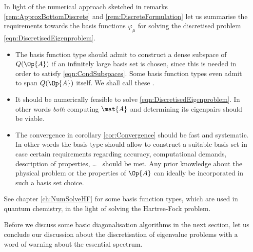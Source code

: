 \begin{rem}
	\label{rem:ChoiceBasisFunction}
In light of the numerical approach sketched in
remarks \ref{rem:ApproxBottomDiscrete} and \ref{rem:DiscreteFormulation}
let us summarise the requirements towards the basis functions $\varphi_\mu$
for solving the discretised problem \eqref{eqn:DiscretisedEigenproblem}.
\begin{itemize}
	\item The basis function type should admit
		to construct a dense subspace of $Q(\Op{A})$
		if an infinitely large basis set is chosen,
		since this is needed in order to satisfy \eqref{eqn:CondSubspaces}.
		Some basis function types even admit to span $Q(\Op{A})$ itself.
		We shall call these .
	\item It should be numerically feasible to solve \eqref{eqn:DiscretisedEigenproblem}.
		In other words \emph{both} computing $\mat{A}$
		and determining its eigenpairs
		should be viable.
	\item The convergence in corollary \ref{cor:Convergence}
		should be fast and systematic.
		In other words the basis type should
		allow to construct a suitable basis set
		in case certain requirements
		regarding accuracy, computational demands,
		description of properties, \ldots~
		should be met.
		Any prior knowledge about the physical problem
		or the properties of $\Op{A}$ can ideally be incorporated
		in such a basis set choice.
\end{itemize}
See chapter \vref{ch:NumSolveHF} for some basis function types,
which are used in quantum chemistry,
in the light of solving the Hartree-Fock problem.
\end{rem}

Before we discuss some basic diagonalisation
algorithms in the next section,
let us conclude our discussion about the discretisation
of eigenvalue problems
with a word of warning about the essential spectrum.

